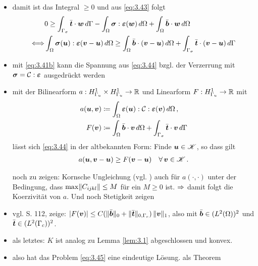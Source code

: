 \begin{itemize}
\item damit ist das Integral $\ge 0$ und aus \eqref{eq:3.43} folgt
\begin{align}\notag
	& 0 \ge \int_{\Gamma_\sigma} \bar{\boldsymbol t} \cdot \boldsymbol w \, d\Gamma-\int_\Omega \boldsymbol\sigma: \boldsymbol {\varepsilon}(\boldsymbol w) \, d\Omega + \int_\Omega \bar{\boldsymbol b} \cdot \boldsymbol w \, d\Omega \\
	\label{eq:3.44}
	\Longleftrightarrow& \int_\Omega \boldsymbol\sigma(\boldsymbol u): \boldsymbol {\varepsilon}(\boldsymbol v - \boldsymbol u) \, d\Omega \ge\int_\Omega \bar{\boldsymbol b} \cdot (\boldsymbol v-\boldsymbol u) \, d\Omega+ \int_{\Gamma_\sigma} \bar{\boldsymbol t} \cdot (\boldsymbol v-\boldsymbol u) \, d\Gamma 
\end{align}

\item mit \eqref{eq:3.41b} kann die Spannung aus \eqref{eq:3.44} bzgl. der Verzerrung mit $\boldsymbol\sigma = \mathcal C : \boldsymbol{\varepsilon}$ ausgedrückt werden

\item mit der Bilinearform $a: H^1_{\Gamma_u} \times H^1_{\Gamma_u} \rightarrow \mathbb{R}$ und Linearform $F: H^1_{\Gamma_u} \rightarrow \mathbb{R}$ mit
\begin{align*}
	a(\boldsymbol u,\boldsymbol v) &\coloneqq \int_\Omega \boldsymbol{\varepsilon} (\boldsymbol u) : \mathcal C : \boldsymbol{\varepsilon}(\boldsymbol v) \, d\Omega \, ,\\ 
	 F(\boldsymbol v)& \coloneqq \int_\Omega \bar{\boldsymbol b} \cdot \boldsymbol v \, d\Omega + \int_{\Gamma_\sigma} \bar{\boldsymbol t} \cdot \boldsymbol v \, d\Gamma 
\end{align*}
lässt sich \eqref{eq:3.44} in der altbekannten Form: Finde $\boldsymbol u \in \mathscr K$, so dass gilt
\begin{align}\label{eq:3.45}
	a(\boldsymbol u, \boldsymbol v - \boldsymbol u) \ge F(\boldsymbol v- \boldsymbol u) \quad \forall \, \boldsymbol v \in \mathscr K \, .
\end{align}

\item[noch zu zeigen:] Kornsche Ungleichung (vgl. \cite{BraeFEM}) auch für $a(\cdot,\cdot)$ unter der Bedingung, dass $\max \lVert C_{ijkl}\rVert \le M$ für ein $M\ge 0$ ist. $\Rightarrow$ damit folgt die Koerzivität von $a$. Und noch Stetigkeit zeigen

\item vgl. \cite{KikOden} S. 112, zeige: $\lvert F(\boldsymbol v)\rvert \le C(\lVert \bar{\boldsymbol b}\rVert_0+\lVert \bar{\boldsymbol t}\rVert_{0,\Gamma_c})\, \lVert \boldsymbol v\rVert_1$, also mit $\bar{\boldsymbol b} \in (L^2(\Omega))^2$ und $\bar{\boldsymbol t} \in (L^2(\Gamma_c))^2$.

\item als letztes: $K$ ist analog zu Lemma \ref{lem:3.1} abgeschlossen und konvex.

\item also hat das Problem \eqref{eq:3.45} eine eindeutige Lösung. als Theorem
\begin{theorem}


\end{theorem}
\end{itemize}
